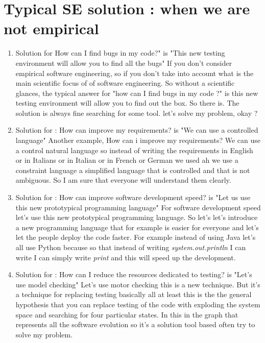 \documentclass[conference, compsoc, twoside]{IEEEtran}
\begin{document}
\section{Typical SE solution : when we are not empirical} %
\begin{enumerate}
\item Solution for How can I find bugs in my code?" is "This new testing environment will allow you to find all the bugs"
If you don't consider empirical software engineering, so if you don't take into account what is the main scientific focus of of software engineering. So without a scientific glances, the typical answer for "how can I find bugs in my code ?" is this new testing environment will allow you to find out the box. So there is. The solution is always fine searching for some tool. let's solve my problem, okay ?
\item Solution for : How can improve my requirements? is "We can use a controlled language"
Another example, How can i improve my requirements? 
We can use a control natural language so instead of writing the requirements in English or in Italians or in Italian or in French or German we used ah we use a constraint language a simplified language that is controlled and that is not ambiguous. 
So I am sure that everyone will understand them clearly.
\item Solution for : How can improve software development speed? is "Let us use this new prototypical programming language"
For software development speed let's use this new prototypical programming language.
So let's let's introduce a new programming language that for example is easier for everyone and let's let the people deploy the code faster. 
For example instead of using Java let's all use Python because so that instead of writing \textit{system.out.println} I can write I can simply write \textit{print} and this will speed up the development.
\item Solution for : How can I reduce the resources dedicated to testing? is "Let’s use model checking"
Let's use motor checking this is a new technique. But it's a technique for replacing testing basically all at least this is the the general hypothesis that you can replace testing of the code with exploding the system space and searching for four particular states.
In this in the graph that represents all the software evolution so it's a solution tool based often try to solve my problem.
	
\end{enumerate}
\end{document}
